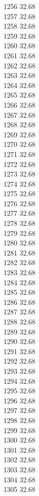 1256	32.68\\
1257	32.68\\
1258	32.68\\
1259	32.68\\
1260	32.68\\
1261	32.68\\
1262	32.68\\
1263	32.68\\
1264	32.68\\
1265	32.68\\
1266	32.68\\
1267	32.68\\
1268	32.68\\
1269	32.68\\
1270	32.68\\
1271	32.68\\
1272	32.68\\
1273	32.68\\
1274	32.68\\
1275	32.68\\
1276	32.68\\
1277	32.68\\
1278	32.68\\
1279	32.68\\
1280	32.68\\
1281	32.68\\
1282	32.68\\
1283	32.68\\
1284	32.68\\
1285	32.68\\
1286	32.68\\
1287	32.68\\
1288	32.68\\
1289	32.68\\
1290	32.68\\
1291	32.68\\
1292	32.68\\
1293	32.68\\
1294	32.68\\
1295	32.68\\
1296	32.68\\
1297	32.68\\
1298	32.68\\
1299	32.68\\
1300	32.68\\
1301	32.68\\
1302	32.68\\
1303	32.68\\
1304	32.68\\
1305	32.68\\
